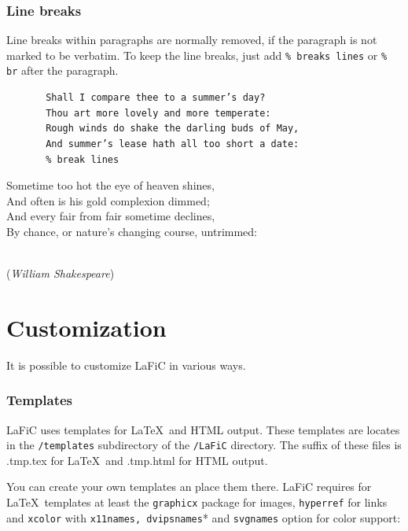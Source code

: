 \documentclass{article}
\begin{document}
\section{Line breaks}

{Line breaks within paragraphs are normally removed, if the
paragraph is not marked to be verbatim. To keep the line
breaks, just add \texttt{\% breaks lines} or \texttt{\% br} after the paragraph.\\}

\begin{verbatim}
       Shall I compare thee to a summer’s day?
       Thou art more lovely and more temperate:
       Rough winds do shake the darling buds of May,
       And summer’s lease hath all too short a date:
       % break lines
\end{verbatim}


{Sometime too hot the eye of heaven shines,\\
And often is his gold complexion dimmed;\\
And every fair from fair sometime declines,\\
By chance, or nature’s changing course, untrimmed:\\\\}

{\raggedleft%
(\emph{William Shakespeare})\\}

\part{Customization}

{It is possible to customize LaFiC in various ways.\\}

\section{Templates}

{LaFiC uses templates for \LaTeX\  and HTML output. These
templates are locates in the \texttt{/templates} subdirectory of the
\texttt{/LaFiC} directory. The suffix of these files is .tmp.tex for
\LaTeX\  and .tmp.html for HTML output.\\}

{You can create your own templates an place them there. LaFiC
requires for \LaTeX\  templates at least the \texttt{graphicx} package
for images, \texttt{hyperref} for links and \texttt{xcolor} with \texttt{x11names, dvipsnames}*
and \texttt{svgnames} option for color support:\\}
\end{document}
